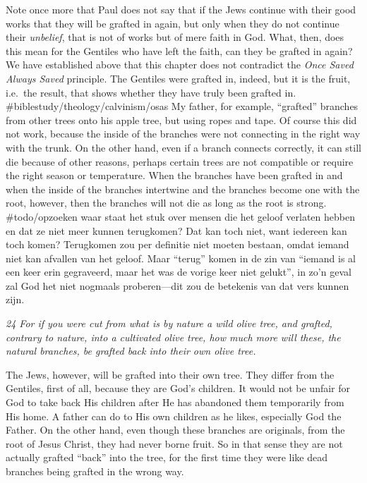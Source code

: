 Note once more that Paul does not say that if the Jews continue with
their good works that they will be grafted in again, but only when they
do not continue their \emph{unbelief}, that is not of works but of mere
faith in God. What, then, does this mean for the Gentiles who have left
the faith, can they be grafted in again? We have established above that
this chapter does not contradict the \emph{Once Saved Always Saved}
principle. The Gentiles were grafted in, indeed, but it is the fruit,
i.e.~the result, that shows whether they have truly been grafted in.
\#biblestudy/theology/calvinism/osas My father, for example, ``grafted''
branches from other trees onto his apple tree, but using ropes and tape.
Of course this did not work, because the inside of the branches were not
connecting in the right way with the trunk. On the other hand, even if a
branch connects correctly, it can still die because of other reasons,
perhaps certain trees are not compatible or require the right season or
temperature. When the branches have been grafted in and when the inside
of the branches intertwine and the branches become one with the root,
however, then the branches will not die as long as the root is strong.
\#todo/opzoeken waar staat het stuk over mensen die het geloof verlaten
hebben en dat ze niet meer kunnen terugkomen? Dat kan toch niet, want
iedereen kan toch komen? Terugkomen zou per definitie niet moeten
bestaan, omdat iemand niet kan afvallen van het geloof. Maar ``terug''
komen in de zin van ``iemand is al een keer erin gegraveerd, maar het
was de vorige keer niet gelukt'', in zo'n geval zal God het niet
nogmaals proberen---dit zou de betekenis van dat vers kunnen zijn.

\emph{24 For if you were cut from what is by nature a wild olive tree,
and grafted, contrary to nature, into a cultivated olive tree, how much
more will these, the natural branches, be grafted back into their own
olive tree.}

The Jews, however, will be grafted into their own tree. They differ from
the Gentiles, first of all, because they are God's children. It would
not be unfair for God to take back His children after He has abandoned
them temporarily from His home. A father can do to His own children as
he likes, especially God the Father. On the other hand, even though
these branches are originals, from the root of Jesus Christ, they had
never borne fruit. So in that sense they are not actually grafted
``back'' into the tree, for the first time they were like dead branches
being grafted in the wrong way.

